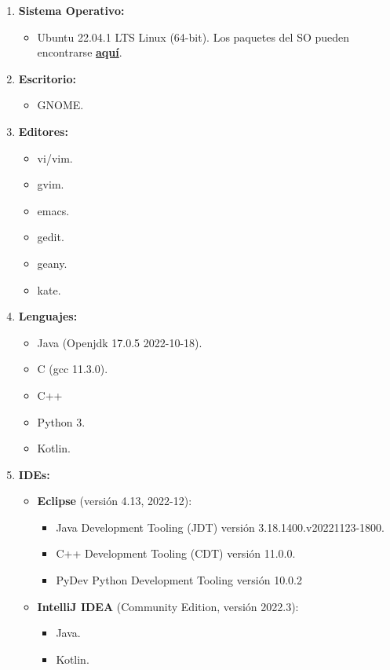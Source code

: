 \documentclass[12pt]{article}
\begin{document}
\begin{enumerate}
\item \textbf{Sistema Operativo:}
  \begin{itemize}
  \item Ubuntu 22.04.1 LTS Linux (64-bit). Los paquetes del SO pueden encontrarse \href{https://image.icpc.global/icpc2024/filesystem.manifest.amd64.txt}{\textbf{aquí}}.
  \end{itemize}
\item \textbf{Escritorio:}
  \begin{itemize}
  \item GNOME.
  \end{itemize}
\item \textbf{Editores:}
  \begin{itemize}
  \item vi/vim.
  \item gvim.
  \item emacs.
  \item gedit.
  \item geany.
  \item kate.
  \end{itemize}
\item \textbf{Lenguajes:}
  \begin{itemize}
  \item Java (Openjdk 17.0.5 2022-10-18).
  \item C (gcc 11.3.0).
  \item C++
  \item Python 3.
  \item Kotlin.
  \end{itemize}
\item \textbf{IDEs:}
  \begin{itemize}
  \item \textbf{Eclipse} (versión 4.13, 2022-12):
    \begin{itemize}
    \item Java Development Tooling (JDT) versión 3.18.1400.v20221123-1800.
    \item C++ Development Tooling (CDT) versión 11.0.0.
    \item PyDev Python Development Tooling versión 10.0.2
    \end{itemize}
  \item \textbf{IntelliJ IDEA} (Community Edition, versión 2022.3):
    \begin{itemize}
    \item Java.
    \item Kotlin.

\end{itemize}
\end{itemize}
\end{enumerate}
\end{document}
